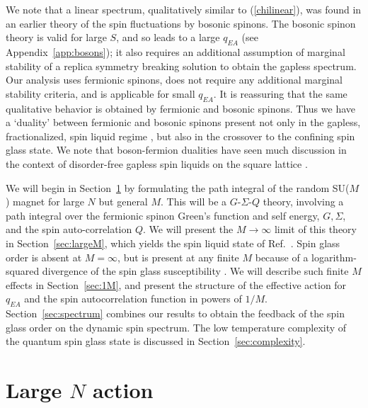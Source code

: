 \documentclass[aps,prx,preprint,onecolumn,citeautoscript,superscriptaddress,nofootinbib,
eqsecnum]{revtex4}
\begin{document}
We note that a linear spectrum, qualitatively similar to (\ref{chilinear}), was found in an earlier theory \cite{GPS00,GPS01} of the spin fluctuations by bosonic spinons. The bosonic spinon theory is valid for large $S$, and so leads to a large $q_{EA}$ (see Appendix~\ref{app:bosons}); it also requires an additional assumption of marginal stability of a replica symmetry breaking solution to obtain the gapless spectrum. 
Our analysis uses fermionic spinons, does not require any additional marginal stability criteria, and is applicable for 
small $q_{EA}$. It is reassuring that the same qualitative behavior is obtained by fermionic and bosonic spinons. Thus we have a `duality' between fermionic and bosonic spinons present not only in the gapless, fractionalized, spin liquid regime \cite{SY92}, but also in the crossover to the confining spin glass state. We note that boson-fermion dualities have seen much discussion in the context of disorder-free gapless spin liquids on the square lattice \cite{Wang2017,Thomson:2017ros}. 

We will begin in Section~\ref{sec:largeN} by formulating the path integral of the random SU($M$) magnet for large $N$ but general $M$. This will be a $G$-$\Sigma$-$Q$ theory, 
involving a path integral over the fermionic spinon Green's function and self energy, $G,\Sigma$, and the spin auto-correlation $Q$. We will present the $M \rightarrow \infty$ limit of this theory in Section~\ref{sec:largeM}, which yields the spin liquid state of Ref.~\cite{SY92}. Spin glass order is absent at $M=\infty$, but is present at any finite $M$ because of a logarithm-squared divergence of the spin glass susceptibility \cite{GPS01}. We will describe such finite $M$ effects in Section~\ref{sec:1M}, and present the structure of the effective action for $q_{EA}$ and the spin autocorrelation function in powers of $1/M$. Section~\ref{sec:spectrum} combines our results to obtain the feedback of the spin glass order on the dynamic spin spectrum. The low temperature complexity of the quantum spin glass state is discussed in Section~\ref{sec:complexity}.

\section{Large $N$ action}
\label{sec:largeN}
\end{document}
